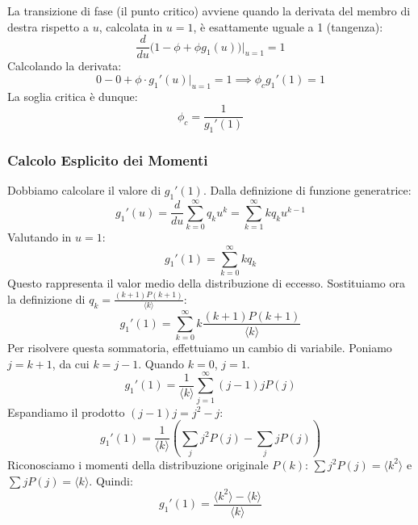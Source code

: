 La transizione di fase (il punto critico) avviene quando la derivata del membro di destra rispetto a $u$, calcolata in $u=1$, è esattamente uguale a 1 (tangenza):
\begin{equation}
    \frac{d}{du} \Big( 1 - \phi + \phi g_1(u) \Big) \Big|_{u=1} = 1
\end{equation}
Calcolando la derivata:
\begin{equation}
    0 - 0 + \phi \cdot g_1'(u) \Big|_{u=1} = 1 \implies \phi_c g_1'(1) = 1
\end{equation}
La soglia critica è dunque:
\begin{equation}
    \phi_c = \frac{1}{g_1'(1)}
\end{equation}

\subsubsection{Calcolo Esplicito dei Momenti}

Dobbiamo calcolare il valore di $g_1'(1)$. Dalla definizione di funzione generatrice:
\begin{equation}
    g_1'(u) = \frac{d}{du} \sum_{k=0}^{\infty} q_k u^k = \sum_{k=1}^{\infty} k q_k u^{k-1}
\end{equation}
Valutando in $u=1$:
\begin{equation}
    g_1'(1) = \sum_{k=0}^{\infty} k q_k
\end{equation}
Questo rappresenta il valor medio della distribuzione di eccesso. Sostituiamo ora la definizione di $q_k = \frac{(k+1)P(k+1)}{\langle k \rangle}$:
\begin{equation}
    g_1'(1) = \sum_{k=0}^{\infty} k \frac{(k+1)P(k+1)}{\langle k \rangle}
\end{equation}
Per risolvere questa sommatoria, effettuiamo un cambio di variabile. Poniamo $j = k+1$, da cui $k = j-1$. Quando $k=0$, $j=1$.
\begin{equation}
    g_1'(1) = \frac{1}{\langle k \rangle} \sum_{j=1}^{\infty} (j-1) j P(j)
\end{equation}
Espandiamo il prodotto $(j-1)j = j^2 - j$:
\begin{equation}
    g_1'(1) = \frac{1}{\langle k \rangle} \left( \sum_{j} j^2 P(j) - \sum_{j} j P(j) \right)
\end{equation}
Riconosciamo i momenti della distribuzione originale $P(k)$: $\sum j^2 P(j) = \langle k^2 \rangle$ e $\sum j P(j) = \langle k \rangle$.
Quindi:
\begin{equation}
    g_1'(1) = \frac{\langle k^2 \rangle - \langle k \rangle}{\langle k \rangle}
\end{equation}

